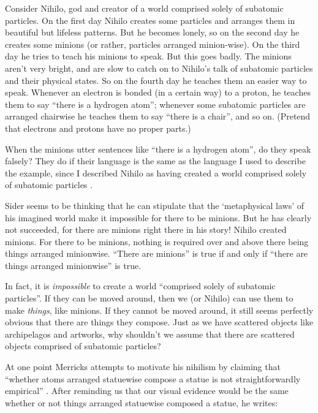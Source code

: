 \documentclass[11pt]{article}
\newenvironment{squote}{%
\begin{spacing}{1}
       	\begin{list}{}{%
\setlength{\labelwidth}{0pt}%
\rightmargin\leftmargin%
}
\item\relax
}{%
\end{list}%
\end{spacing}
}
\begin{document}
\begin{spacing}{1.25}
\begin{squote}
Consider Nihilo, god and creator of a world comprised solely of
subatomic particles.  On the first day Nihilo creates some particles
and arranges them in beautiful but lifeless patterns.  But he becomes
lonely, so on the second day he creates some minions (or rather,
particles arranged minion-wise).  On the third day he tries to teach
his minions to speak.  But this goes badly.  The minions aren't very
bright, and are slow to catch on to Nihilo's talk of subatomic
particles and their physical states.  So on the fourth day he teaches
them an easier way to speak.  Whenever an electron is bonded (in a
certain way) to a proton, he teaches them to say ``there is a hydrogen
atom''; whenever some subatomic particles are arranged chairwise he
teaches them to say ``there is a chair'', and so on.  (Pretend that
electrons and protons have no proper parts.)

When the minions utter sentences like ``there is a hydrogen atom'', do
they speak falsely?  They do if their language is the same as the
language I used to describe the example, since I described Nihilo as
having created a world comprised solely of subatomic particles
\citeyearpar[7]{sider2011c}.
\end{squote}

Sider seems to be thinking that he can stipulate that the
`metaphysical laws' of his imagined world make it impossible for there
to be minions.  But he has clearly not succeeded, for there are
minions right there in his story!  Nihilo created minions.  For there
to be minions, nothing is required over and above there being things
arranged minionwise.  ``There are minions'' is true if and only if
``there are things arranged minionwise'' is true.

In fact, it is {\em impossible} to create a world ``comprised solely
of subatomic particles''.  If they can be moved around, then we (or
Nihilo) can use them to make {\em things}, like minions.  If they
cannot be moved around, it still seems perfectly obvious that there
are things they compose.  Just as we have scattered objects like
archipelagos and artworks, why shouldn't we assume that there are
scattered objects comprised of subatomic particles?

At one point Merricks attempts to motivate his nihilism by claiming
that ``whether atoms arranged statuewise compose a statue is not
straightforwardly empirical'' \citeyearpar[9]{merricks2001a}.  After
reminding us that our visual evidence would be the same whether or not
things arranged statuewise composed a statue, he writes:


\end{spacing}
\end{document}
